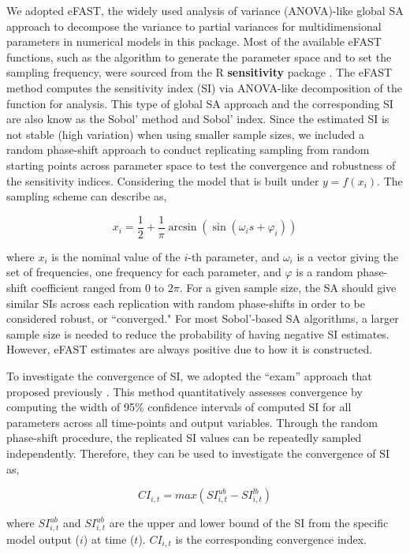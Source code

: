 \documentclass[preprint,12pt, a4paper]{elsarticle}
\begin{document}
We adopted eFAST, the widely used analysis of variance (ANOVA)-like global SA approach to decompose the variance to partial variances for multidimensional parameters in numerical models in this package. Most of the available eFAST functions, such as the algorithm to generate the parameter space and to set the sampling frequency, were sourced from the R \textbf{sensitivity} package \cite{R-sensitivity}. The eFAST method computes the sensitivity index (SI) via ANOVA-like decomposition of the function for analysis. This type of global SA approach and the corresponding SI are also know as the Sobol' method and Sobol' index. Since the estimated SI is not stable (high variation) when using smaller sample sizes, we included a random phase-shift approach to conduct replicating sampling from random starting points across parameter space to test the convergence and robustness of the sensitivity indices. Considering the model that is built under \(y=f(x_{i})\). The sampling scheme can describe as,

\[ x_i = \frac{1}{2} + \frac{1}{\pi}\arcsin(\sin(\omega_is + \varphi_i)) \]

where \(x_i\) is the nominal value of the \(i\)-th parameter, and \(\omega_i\) is a vector giving the set of frequencies, one frequency for each parameter, and \(\varphi\) is a random phase-shift coefficient
ranged from 0 to \(2\pi\). For a given sample size, the SA should give similar SIs across each replication with random phase-shifts in order to be considered robust, or ``converged." For most Sobol'-based SA algorithms, a larger sample size is needed to reduce the probability of having negative SI estimates. However, eFAST estimates are always positive due to how it is constructed.

To investigate the convergence of SI, we adopted the ``exam'' approach that proposed previously \cite{sarrazin2016global}. This method quantitatively assesses convergence by computing the width of 95\% confidence intervals of computed SI for all parameters across all time-points and output variables. Through the random phase-shift procedure, the replicated SI values can be repeatedly sampled independently. Therefore, they can be used to investigate the convergence of SI as,

\[CI_{i,t} = max(SI_{i,t}^{ub}-SI_{i,t}^{lb})\]

where \(SI_{i,t}^{ub}\) and \(SI_{i,t}^{ub}\) are the upper and lower bound of the SI from the specific model output (\(i\)) at time (\(t\)). \(CI_{i,t}\) is the corresponding convergence index.
\end{document}
